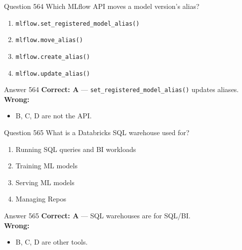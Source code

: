 \documentclass[aspectratio=169,11pt]{beamer}
\begin{document}
	\begin{frame}{Question 564}
		Which MLflow API moves a model version's alias?
		\begin{enumerate}[label=\Alph*.]
			\item \texttt{mlflow.set\_registered\_model\_alias()}
			\item \texttt{mlflow.move\_alias()}
			\item \texttt{mlflow.create\_alias()}
			\item \texttt{mlflow.update\_alias()}
		\end{enumerate}
	\end{frame}
	\begin{frame}{Answer 564}
		\textbf{Correct: A} --- \texttt{set\_registered\_model\_alias()} updates aliases.\\
		\vspace{0.5em}
		\textbf{Wrong:}
		\begin{itemize}
			\item B, C, D are not the API.
		\end{itemize}
	\end{frame}
	
	\begin{frame}{Question 565}
		What is a Databricks SQL warehouse used for?
		\begin{enumerate}[label=\Alph*.]
			\item Running SQL queries and BI workloads
			\item Training ML models
			\item Serving ML models
			\item Managing Repos
		\end{enumerate}
	\end{frame}
	\begin{frame}{Answer 565}
		\textbf{Correct: A} --- SQL warehouses are for SQL/BI.\\
		\vspace{0.5em}
		\textbf{Wrong:}
		\begin{itemize}
			\item B, C, D are other tools.
		\end{itemize}
	\end{frame}
	
\end{document}
